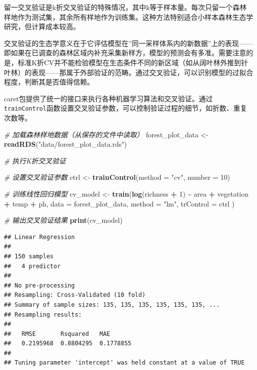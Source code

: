 \documentclass[
  twoside,12pt,fontset=none]{ctexbook}
\newenvironment{Shaded}{\begin{snugshade}}{\end{snugshade}}
\newcommand{\AttributeTok}[1]{\textcolor[rgb]{0.13,0.29,0.53}{#1}}
\newcommand{\CommentTok}[1]{\textcolor[rgb]{0.56,0.35,0.01}{\textit{#1}}}
\newcommand{\DecValTok}[1]{\textcolor[rgb]{0.00,0.00,0.81}{#1}}
\newcommand{\FunctionTok}[1]{\textcolor[rgb]{0.13,0.29,0.53}{\textbf{#1}}}
\newcommand{\NormalTok}[1]{#1}
\newcommand{\OtherTok}[1]{\textcolor[rgb]{0.56,0.35,0.01}{#1}}
\newcommand{\SpecialCharTok}[1]{\textcolor[rgb]{0.81,0.36,0.00}{\textbf{#1}}}
\newcommand{\StringTok}[1]{\textcolor[rgb]{0.31,0.60,0.02}{#1}}
\begin{document}
留一交叉验证是k折交叉验证的特殊情况，其中k等于样本量。每次只留一个森林样地作为测试集，其余所有样地作为训练集。这种方法特别适合小样本森林生态学研究，但计算成本较高。

交叉验证的生态学意义在于它评估模型在''同一采样体系内的新数据''上的表现------即如果在已调查的森林区域内补充采集新样方，模型的预测会有多准。需要注意的是，标准K折CV并不能检验模型在生态条件不同的新区域（如从阔叶林外推到针叶林）的表现------那属于外部验证的范畴。通过交叉验证，可以识别模型的过拟合程度，判断其是否值得信赖。

caret包提供了统一的接口来执行各种机器学习算法和交叉验证。通过\texttt{trainControl}函数设置交叉验证参数，可以控制验证过程的细节，如折数、重复次数等。

\begin{Shaded}
\begin{Highlighting}[]
\CommentTok{\# 加载森林样地数据（从保存的文件中读取）}
\NormalTok{forest\_plot\_data }\OtherTok{\textless{}{-}} \FunctionTok{readRDS}\NormalTok{(}\StringTok{"data/forest\_plot\_data.rds"}\NormalTok{)}

\CommentTok{\# 执行K折交叉验证}

\CommentTok{\# 设置交叉验证参数}
\NormalTok{ctrl }\OtherTok{\textless{}{-}} \FunctionTok{trainControl}\NormalTok{(}\AttributeTok{method =} \StringTok{"cv"}\NormalTok{, }\AttributeTok{number =} \DecValTok{10}\NormalTok{)}

\CommentTok{\# 训练线性回归模型}
\NormalTok{cv\_model }\OtherTok{\textless{}{-}} \FunctionTok{train}\NormalTok{(}\FunctionTok{log}\NormalTok{(richness }\SpecialCharTok{+} \DecValTok{1}\NormalTok{) }\SpecialCharTok{\textasciitilde{}}\NormalTok{ area }\SpecialCharTok{+}\NormalTok{ vegetation }\SpecialCharTok{+}\NormalTok{ temp }\SpecialCharTok{+}\NormalTok{ ph,}
  \AttributeTok{data =}\NormalTok{ forest\_plot\_data,}
  \AttributeTok{method =} \StringTok{"lm"}\NormalTok{,}
  \AttributeTok{trControl =}\NormalTok{ ctrl}
\NormalTok{)}

\CommentTok{\# 输出交叉验证结果}
\FunctionTok{print}\NormalTok{(cv\_model)}
\end{Highlighting}
\end{Shaded}

\begin{verbatim}
## Linear Regression 
## 
## 150 samples
##   4 predictor
## 
## No pre-processing
## Resampling: Cross-Validated (10 fold) 
## Summary of sample sizes: 135, 135, 135, 135, 135, 135, ... 
## Resampling results:
## 
##   RMSE       Rsquared   MAE      
##   0.2195968  0.8804295  0.1778855
## 
## Tuning parameter 'intercept' was held constant at a value of TRUE
\end{verbatim}
\end{document}
